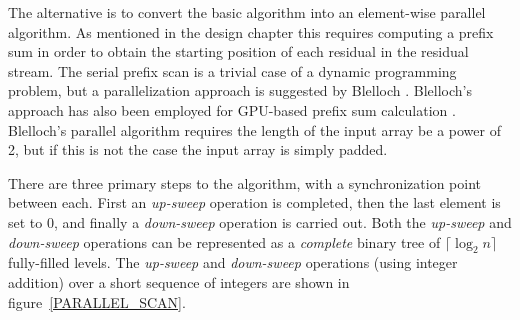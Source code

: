   The alternative is to convert the basic algorithm into an element-wise parallel algorithm. As mentioned in the design chapter this requires computing a prefix sum  
  in order to obtain the starting position of each residual in the residual stream. The serial prefix scan is a trivial case of a dynamic programming problem, but a
  parallelization approach is suggested by Blelloch \cite{blelloch1990prefix}. Blelloch's approach has also been employed for GPU-based prefix sum calculation \cite{harris2007parallel}. 
  Blelloch's parallel algorithm requires the length of the input array be a power of 2, but if this is not the case the input array is simply padded. 
  
  There are three primary steps to the algorithm, with a synchronization point between each. First an \textit{up-sweep} operation is completed, then the last element is set to 0, 
  and finally a \textit{down-sweep} operation is carried out. Both the \textit{up-sweep} and \textit{down-sweep} operations can be represented as a \textit{complete} binary tree 
  of $\lceil\log_2n\rceil$ fully-filled levels. The \textit{up-sweep} and \textit{down-sweep} operations (using integer addition) over a short sequence of integers are shown in 
  figure~\ref{PARALLEL_SCAN}. 
  
